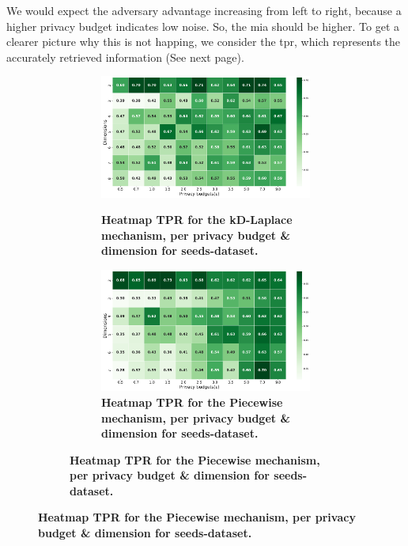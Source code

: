 {We would expect the adversary advantage increasing from left to right, because a higher privacy budget indicates low noise. So, the \gls{mia} should be higher.
To get a clearer picture why this is not happing, we consider the \gls{tpr}, which represents the accurately retrieved information (See next page). \newpage
\begin{figure}[H]
    \centering
    \begin{subfigure}[b]{0.75\textwidth}
        \begin{subfigure}[c]{1\textwidth}
            \caption{\textbf{Heatmap TPR for the kD-Laplace mechanism, per privacy budget \& dimension for seeds-dataset.}}
            \includegraphics[width=1\textwidth]{Results/kd-laplace/kd-Laplace/seeds-dataset/tpr.png}
            \label{fig:privacy_tpr_seeds-dataset_adversial_advantage_kd-laplace}
        \end{subfigure}
        \vfill %
        \begin{subfigure}[c]{1\textwidth}
            \caption{\textbf{Heatmap TPR for the Piecewise mechanism, per privacy budget \& dimension for seeds-dataset.}}
            \includegraphics[width=1\textwidth]{Results/kd-laplace/piecewise/seeds-dataset/tpr.png}

\end{subfigure}
\end{subfigure}
\end{figure}}
